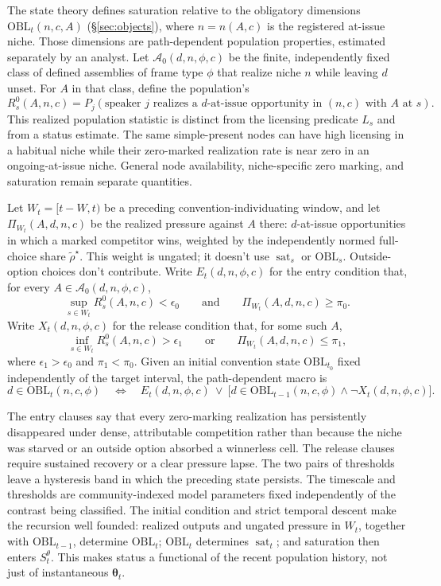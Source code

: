 The state theory defines saturation relative to the obligatory dimensions
$\mathrm{OBL}_t(n,c,A)$ (\S\ref{sec:objects}), where $n=n(A,c)$ is the
registered at-issue niche. Those dimensions are path-dependent population
properties, estimated separately by an analyst. Let
$\mathcal{A}_0(d,n,\phi,c)$ be the finite, independently fixed class of defined
assemblies of frame type $\phi$ that realize niche $n$ while leaving $d$ unset.
For $A$ in that class, define the population's 
\[
R_s^0(A,n,c)=P_j\!\left(\text{speaker $j$ realizes a $d$-at-issue opportunity
in $(n,c)$ with $A$ at $s$}\right).
\]
This realized population statistic is distinct from the licensing predicate
$L_s$ and from a status estimate. The same simple-present nodes can have high
licensing in a habitual niche while their zero-marked realization rate is near
zero in an ongoing-at-issue niche. General node availability, niche-specific
zero marking, and saturation remain separate quantities.

Let $W_t=[t-W,t)$ be a preceding convention-individuating window, and let
$\Pi_{W_t}(A,d,n,c)$ be the realized pressure against $A$ there: $d$-at-issue
opportunities in which a marked competitor wins, weighted by the independently
normed full-choice share $\widetilde\rho^\star$. This weight is ungated; it
doesn't use $\operatorname{sat}_s$ or $\mathrm{OBL}_s$. Outside-option choices
don't contribute. Write $E_t(d,n,\phi,c)$ for the entry condition that, for
every $A\in\mathcal A_0(d,n,\phi,c)$,
\[
\sup_{s\in W_t}R_s^0(A,n,c)<\epsilon_0
\qquad\text{and}\qquad
\Pi_{W_t}(A,d,n,c)\geq\pi_0.
\]
Write $X_t(d,n,\phi,c)$ for the release condition that, for some such $A$,
\[
\inf_{s\in W_t}R_s^0(A,n,c)>\epsilon_1
\qquad\text{or}\qquad
\Pi_{W_t}(A,d,n,c)\leq\pi_1,
\]
where $\epsilon_1>\epsilon_0$ and $\pi_1<\pi_0$. Given an initial convention
state $\mathrm{OBL}_{t_0}$ fixed independently of the target interval, the
path-dependent macro is
\[
d\in\mathrm{OBL}_t(n,c,\phi)
\quad\Longleftrightarrow\quad
E_t(d,n,\phi,c)\ \lor\
\bigl[d\in\mathrm{OBL}_{t-1}(n,c,\phi)\land
\neg X_t(d,n,\phi,c)\bigr].
\]

The entry clauses say that every zero-marking realization has persistently
disappeared under dense, attributable competition rather than because the niche
was starved or an outside option absorbed a winnerless cell. The release clauses
require sustained recovery or a clear pressure lapse. The two pairs of
thresholds leave a hysteresis band in which the preceding state persists. The
timescale and thresholds are
community-indexed model parameters fixed independently of the contrast being
classified. The initial condition and strict temporal descent make the
recursion well founded: realized outputs and ungated pressure in $W_t$, together
with $\mathrm{OBL}_{t-1}$, determine $\mathrm{OBL}_t$;
$\mathrm{OBL}_t$ determines $\operatorname{sat}_t$; and saturation then enters
$S_t^\theta$. This makes status a functional of the recent population
history, not just of instantaneous $\boldsymbol{\theta}_t$.

